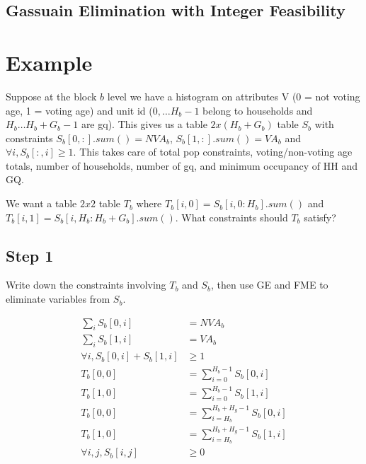 \documentclass[12pt]{amsart}
\begin{document}
\subsection{Gassuain Elimination with Integer Feasibility}
\section{Example}
Suppose at the block $b$ level we have a histogram on attributes V (0 = not voting age, 1 = voting age) and unit id ($0,\dots H_b-1$ belong to households and $H_b\dots H_b+G_b-1$ are gq). This gives us a table $2x(H_b+G_b)$ table $S_b$ with constraints $S_b[0, :].sum()=NVA_b$, $S_b[1, :].sum()=VA_b$ and  $\forall i, S_b[:, i]\geq 1$. This takes care of total pop constraints, voting/non-voting age totals, number of households, number of gq, and minimum occupancy of HH and GQ.

We want a table $2x2$ table $T_b$ where $T_b[i, 0]=S_b[i, 0:H_b].sum()$ and $T_b[i,1]=S_b[i, H_b:H_b+G_b].sum()$. What constraints should $T_b$ satisfy?

\subsection{Step 1}
Write down the constraints involving $T_b$ and $S_b$, then use GE and FME to eliminate variables from $S_b$.

\begin{align*}
\sum_i S_b[0, i] &= NVA_b\\
\sum_i S_b[1, i] &= VA_b\\
\forall i, S_b[0,i] + S_b[1,i]&\geq 1\\
T_b[0,0] & = \sum_{i=0}^{H_b-1} S_b[0,i]\\
T_b[1,0] & = \sum_{i=0}^{H_b-1} S_b[1,i]\\
T_b[0,0] & = \sum_{i=H_b}^{H_b+H_g-1} S_b[0,i]\\
T_b[1,0] & = \sum_{i=H_b}^{H_b+H_g-1} S_b[1,i]\\
\forall i, j, S_b[i,j]&\geq 0
\end{align*}
 
\end{document}
